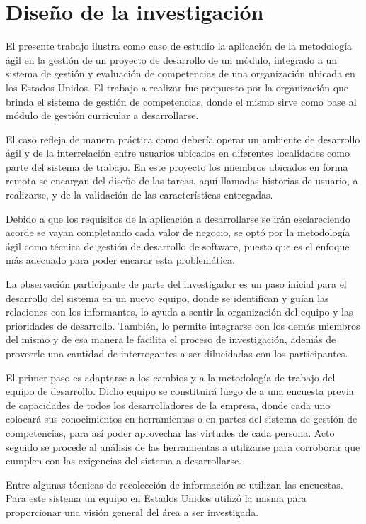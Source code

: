 \section{Diseño de la investigación}
El presente trabajo ilustra como caso de estudio la aplicación de la metodología ágil en la gestión de un proyecto de desarrollo de un módulo, integrado a un sistema de gestión y evaluación de competencias de una organización ubicada en los Estados Unidos. El trabajo a realizar fue propuesto por la organización que brinda el sistema de gestión de competencias, donde el mismo sirve como base al módulo de gestión curricular a desarrollarse.

El caso refleja de manera práctica como debería operar un ambiente de desarrollo ágil y de la interrelación entre usuarios ubicados en diferentes localidades como parte del sistema de trabajo. En este proyecto los miembros ubicados en forma remota se encargan del diseño de las tareas, aquí llamadas historias de usuario, a realizarse, y de la validación de las características entregadas.

Debido a que los requisitos de la aplicación a desarrollarse se irán esclareciendo acorde se vayan completando cada valor de negocio, se optó por la metodología ágil como técnica de gestión de desarrollo de software, puesto que es el enfoque más adecuado para poder encarar esta problemática.

La observación participante de parte del investigador es un paso inicial para el desarrollo del sistema en un nuevo equipo, donde se identifican y guían las relaciones con los informantes, lo ayuda a sentir la organización del equipo y las prioridades de desarrollo. También, lo permite integrarse con los demás miembros del mismo y de esa manera le facilita el proceso de investigación, además de proveerle una cantidad de interrogantes a ser dilucidadas con los participantes\citep{erlandson_doing_1993}.

El primer paso es adaptarse a los cambios y a la metodología de trabajo del equipo de desarrollo. Dicho equipo se constituirá luego de a una encuesta previa de capacidades de todos los desarrolladores de la empresa, donde cada uno colocará sus conocimientos en herramientas o en partes del sistema de gestión de competencias, para así poder aprovechar las virtudes de cada persona. Acto seguido se procede al análisis de las herramientas a utilizarse para corroborar que cumplen con las exigencias del sistema a desarrollarse.

Entre algunas técnicas de recolección de información se utilizan las encuestas\citep{robson_real_2011}. Para este sistema un equipo en Estados Unidos utilizó la misma para proporcionar una visión general del área a ser investigada. 

